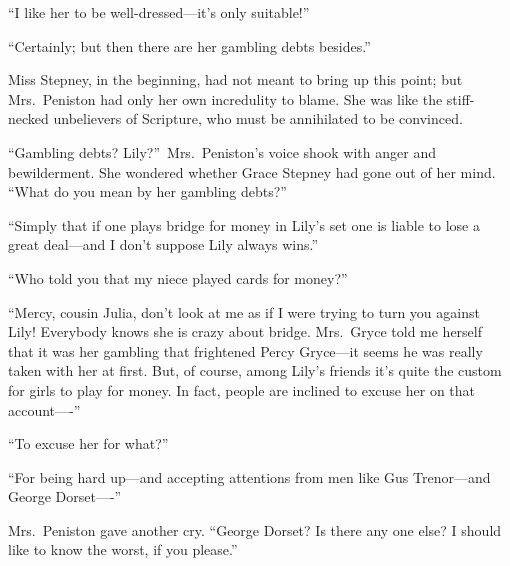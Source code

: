 \documentclass[12pt,a4paper]{book}
\begin{document}
``I like her to be well-dressed---it's only suitable!''





``Certainly; but then there are her gambling debts besides.''





Miss Stepney, in the beginning, had not meant to bring up this
point; but Mrs.\ Peniston had only her own incredulity to blame. 
She was like the stiff-necked unbelievers of Scripture, who must
be annihilated to be convinced.





``Gambling debts? Lily?''\ Mrs.\ Peniston's voice shook with anger
and bewilderment. She wondered whether Grace Stepney had gone out
of her mind. ``What do you mean by her gambling debts?''





``Simply that if one plays bridge for money in Lily's set one is
liable to lose a great deal---and I don't suppose Lily always
wins.''





``Who told you that my niece played cards for money?''





``Mercy, cousin Julia, don't look at me as if I were trying to
turn you against Lily! Everybody knows she is crazy about bridge. 
Mrs.\ Gryce told me herself that it was her gambling that
frightened Percy Gryce---it seems he was really taken with her at
first. But, of course, among Lily's friends it's quite the custom
for girls to play for money. In fact, people are inclined to
excuse her on that account----''





``To excuse her for what?''





``For being hard up---and accepting attentions from men like Gus
Trenor---and George Dorset----''





Mrs.\ Peniston gave another cry. ``George Dorset? Is there any one
else? I should like to know the worst, if you please.''
\end{document}

